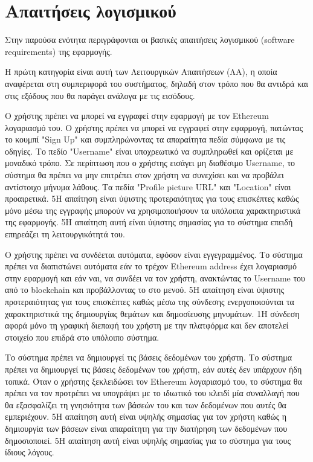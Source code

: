 \section{Απαιτήσεις λογισμικού} \label{section:3-3-requirements}

Στην παρούσα ενότητα περιγράφονται οι βασικές απαιτήσεις λογισμικού (software requirements) της εφαρμογής.

Η πρώτη κατηγορία είναι αυτή των Λειτουργικών Απαιτήσεων (ΛΑ), η οποία αναφέρεται στη συμπεριφορά του συστήματος, δηλαδή στον τρόπο που θα αντιδρά και στις εξόδους που θα παράγει ανάλογα με τις εισόδους.

\begin{enumerate}[label=\textbf{<ΛΑ-\arabic*>}, leftmargin=\parindent, align=left, labelwidth=\parindent, labelsep=0pt]
	\sysReqItem
		{\label{srs:functional-srs-sign-up}}
		{Ο χρήστης πρέπει να μπορεί να εγγραφεί στην εφαρμογή με τον Ethereum λογαριασμό του.}
		{Ο χρήστης πρέπει να μπορεί να εγγραφεί στην εφαρμογή, πατώντας το κουμπί "Sign Up" και συμπληρώνοντας τα απαραίτητα πεδία σύμφωνα με τις οδηγίες. Το πεδίο "Username" είναι υποχρεωτικό να συμπληρωθεί και ορίζεται με μοναδικό τρόπο. Σε περίπτωση που ο χρήστης εισάγει μη διαθέσιμο Username, το σύστημα θα πρέπει να μην επιτρέπει στον χρήστη να συνεχίσει και να προβάλει αντίστοιχο μήνυμα λάθους. Τα πεδία "Profile picture URL" και "Location" είναι προαιρετικά.}
		{5}{Η απαίτηση είναι ύψιστης προτεραιότητας για τους επισκέπτες καθώς μόνο μέσω της εγγραφής μπορούν να χρησιμοποιήσουν τα υπόλοιπα χαρακτηριστικά της εφαρμογής.}
		{5}{Η απαίτηση αυτή είναι ύψιστης σημασίας για το σύστημα επειδή επηρεάζει τη λειτουργικότητά του.}

	\sysReqItem
		{\label{srs:functional-srs-sign-in}}
		{Ο χρήστης πρέπει να συνδέεται αυτόματα, εφόσον είναι εγγεγραμμένος.}
		{Το σύστημα πρέπει να διαπιστώνει αυτόματα εάν το τρέχον Ethereum address έχει λογαριασμό στην εφαρμογή και εάν ναι, να συνδέει να τον χρήστη, ανακτώντας το Username του από το blockchain και προβάλλοντας το στο μενού.}
		{5}{Η απαίτηση είναι ύψιστης προτεραιότητας για τους επισκέπτες καθώς μέσω της σύνδεσης ενεργοποιούνται τα χαρακτηριστικά της δημιουργίας θεμάτων και δημοσίευσης μηνυμάτων.}
		{1}{Η σύνδεση αφορά μόνο τη γραφική διεπαφή του χρήστη με την πλατφόρμα και δεν αποτελεί στοιχείο που επιδρά στο υπόλοιπο σύστημα.}

	\sysReqItem
		{\label{srs:functional-srs-create-user-databases}}
		{Το σύστημα πρέπει να δημιουργεί τις βάσεις δεδομένων του χρήστη.}
		{Το σύστημα πρέπει να δημιουργεί τις βάσεις δεδομένων του χρήστη, εάν αυτές δεν υπάρχουν ήδη τοπικά. Όταν ο χρήστης ξεκλειδώσει τον Ethereum λογαριασμό του, το σύστημα θα πρέπει να τον προτρέπει να υπογράψει με το ιδιωτικό του κλειδί μία συναλλαγή που θα εξασφαλίζει τη γνησιότητα των βάσεών του και των δεδομένων που αυτές θα εμπεριέχουν.}
		{5}{Η απαίτηση αυτή είναι υψηλής σημασίας για τον χρήστη καθώς η δημιουργία των βάσεων είναι απαραίτητη για την διατήρηση των δεδομένων που δημοσιοποιεί.}
		{5}{Η απαίτηση αυτή είναι υψηλής σημασίας για το σύστημα για τους ίδιους λόγους.}


\end{enumerate}
